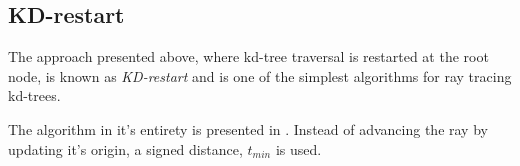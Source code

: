 \begin{figure}
{
    \label{fig:simpleTree}
  }
  \caption{}
  \label{fig:simpleSceneTree}
\end{figure}


\subsection{KD-restart}\label{sec:kdRestart}


The approach presented above, where kd-tree traversal is restarted at
the root node, is known as \textit{KD-restart} and is one of the
simplest algorithms for ray tracing kd-trees.


The algorithm in it's entirety is presented in
. Instead of advancing the ray by updating it's
origin, a signed distance, $t_{min}$ is used.

